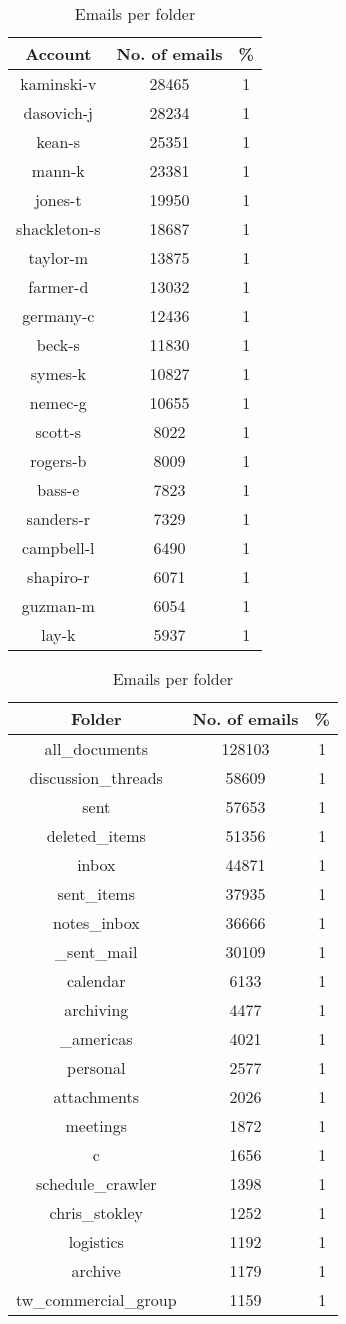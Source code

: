 \documentclass[senior,oneside]{UIUC}
\begin{document}
\begin{table}
\parbox{.45\linewidth}{
\centering
\begin{tabular}{c c c }
\hline \hline
Account & No. of emails & \% \\ [0.5ex]
\hline
kaminski-v & 28465 & 1 \\
dasovich-j & 28234 & 1 \\
kean-s & 25351 & 1 \\
mann-k & 23381 & 1 \\
jones-t & 19950 & 1 \\
shackleton-s & 18687 & 1 \\
taylor-m & 13875 & 1 \\
farmer-d & 13032 & 1 \\
germany-c & 12436 & 1 \\
beck-s & 11830 & 1 \\
symes-k & 10827 & 1 \\
nemec-g & 10655 & 1 \\
scott-s & 8022 & 1 \\
rogers-b & 8009 & 1 \\
bass-e & 7823 & 1 \\
sanders-r & 7329 & 1 \\
campbell-l & 6490 & 1 \\
shapiro-r & 6071 & 1 \\
guzman-m & 6054 & 1 \\
lay-k & 5937 & 1 \\
\hline
\end{tabular}
\caption{Emails per directory}
}
\hfill
\parbox{.45\linewidth}{
\centering
\begin{tabular}{c c c }
\hline \hline
Folder & No. of emails & \% \\ [0.5ex]
\hline
all\_documents & 128103 & 1 \\
discussion\_threads & 58609 & 1 \\
sent & 57653 & 1 \\
deleted\_items & 51356 & 1 \\
inbox & 44871 & 1 \\
sent\_items & 37935 & 1 \\
notes\_inbox & 36666 & 1 \\
\_sent\_mail & 30109 & 1 \\
calendar & 6133 & 1 \\
archiving & 4477 & 1 \\
\_americas & 4021 & 1 \\
personal & 2577 & 1 \\
attachments & 2026 & 1 \\
meetings & 1872 & 1 \\
c & 1656 & 1 \\
schedule\_crawler & 1398 & 1 \\
chris\_stokley & 1252 & 1 \\
logistics & 1192 & 1 \\
archive & 1179 & 1 \\
tw\_commercial\_group & 1159 & 1 \\
\hline
\end{tabular}
\caption{Emails per folder}
}
\end{table}
\end{document}
